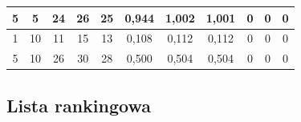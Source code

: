 \documentclass[licencjacka]{pracamgr}
\begin{document}
\begin{table}[H]
{\begin{tabular}{@{}ccccccccccc@{}}
5                                                              & 5                                                      & 24                                                     & 26                                                     & 25                                                        & 0,944                                                     & 1,002                                                     & 1,001                                                         & 0                                                                  & 0                                                                   & 0                                                                      \\ \midrule
1                                                              & 10                                                     & 11                                                     & 15                                                     & 13                                                        & 0,108                                                     & 0,112                                                     & 0,112                                                         & 0                                                                  & 0                                                                   & 0                                                                      \\ \midrule
5                                                              & 10                                                     & 26                                                     & 30                                                     & 28                                                        & 0,500                                                     & 0,504                                                     & 0,504                                                         & 0                                                                  & 0                                                                   & 0                                                                      \\ \bottomrule
\end{tabular}%
}
\end{table}

\subsection{Lista rankingowa}
\end{document}
